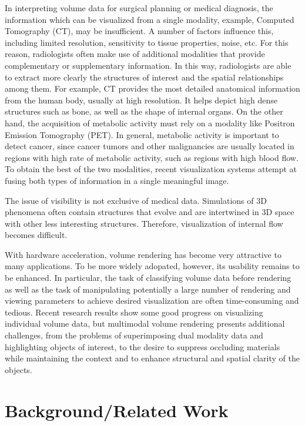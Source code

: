 In interpreting volume data for surgical planning or medical diagnosis, the information which can be visualized from a single modality, example, Computed Tomography (CT), may be insufficient. A number of factors influence this, including limited resolution, sensitivity to tissue properties, noise, etc. For this reason, radiologists often make use of additional modalities that provide complementary or supplementary information. In this way, radiologists are able to extract more clearly the structures of interest and the spatial relationships
among them. For example, CT provides the most detailed anatomical information from the human body, usually at high resolution. It helps depict high dense structures such as bone, as well as the shape of internal organs. On the other hand, the acquisition of metabolic activity must rely on a modality like Positron Emission Tomography (PET). In general, metabolic activity is important to detect cancer, since cancer tumors and other malignancies are usually located in regions with high rate of metabolic activity, such as regions with high blood flow. To obtain the best of the two modalities, recent visualization systems attempt at fusing both types of information in a single meaningful image.


The issue of visibility is not exclusive of medical data. Simulations of 3D phenomena often contain structures that evolve and are intertwined in 3D space with other less interesting structures. Therefore, visualization of internal flow becomes difficult. 

With hardware acceleration, volume rendering has become very attractive to many applications. To be more widely adopated, however, its usability remains to be enhanced. In particular, the task of classifying volume data before rendering as well as the task of manipulating potentially a large number of rendering and viewing parameters to achieve desired visualization are often time-consuming and tedious. Recent research results show some good progress on visualizing individual volume data, but multimodal volume rendering presents additional challenges, from the problems of superimposing dual modality data and highlighting objects of interest, to the desire to suppress occluding materials while maintaining the context and to enhance structural and spatial clarity of the objects.


\section{Background/Related Work}






